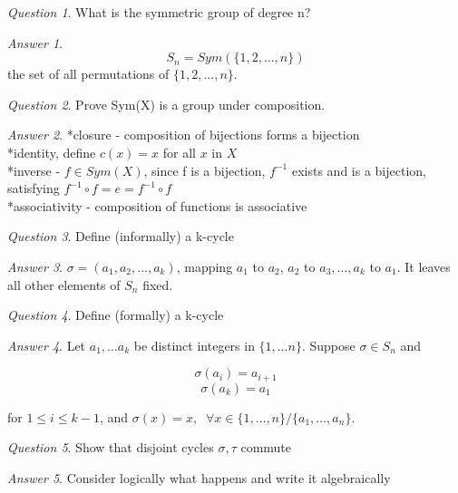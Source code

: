 \documentclass[]{article}
\theoremstyle{remark}
\theoremstyle{qnstyle}
\newtheorem{question}{Question}
\theoremstyle{answerstyle}
\newtheorem*{answer}{Answer}
\begin{document}
\begin{question}
    What is the symmetric group of degree n?
\end{question}
\begin{answer}
    $$S_n = Sym(\{1, 2, \ldots, n \})$$
    the set of all permutations of $\{1, 2, \ldots, n\}$.
\end{answer}


\begin{question}
    Prove Sym(X) is a group under composition.
\end{question}
\begin{answer}
    *closure - composition of bijections forms a bijection \\ 
    *identity, define $c(x) = x$ for all $x$ in $X$ \\
    *inverse - $f \in Sym(X)$, since f is a bijection, $f^{-1}$ exists and is a bijection, satisfying $f^{-1} \circ f = e = f^{-1} \circ f$ \\
    *associativity - composition of functions is associative
\end{answer}


\begin{question}
    Define (informally) a k-cycle
\end{question}
\begin{answer}
    $\sigma = (a_1, a_2, \ldots, a_k)$,
mapping $a_1$ to $a_2$, $a_2$ to $a_3, \ldots, a_k$ to $a_1$. It leaves all other elements of $S_n$ fixed.
\end{answer}


\begin{question}
    Define (formally) a k-cycle
\end{question}
\begin{answer}
    Let $a_1, \ldots a_k$ be distinct integers in $\{1, \ldots n\}$. Suppose $\sigma \in S_n$ and

    $$\sigma(a_i) = a_{i+1}$$
    $$\sigma(a_k) = a_1$$

    for $1 \leq i \leq k-1$, and $\sigma(x) = x, \;\; \forall x \in \{1, \ldots, n \} / \{a_1, \ldots, a_n\}$.
\end{answer}

\begin{question}
    Show that disjoint cycles $\sigma, \tau$ commute
\end{question}
\begin{answer}
    Consider logically what happens and write it algebraically
\end{answer}
\end{document}
